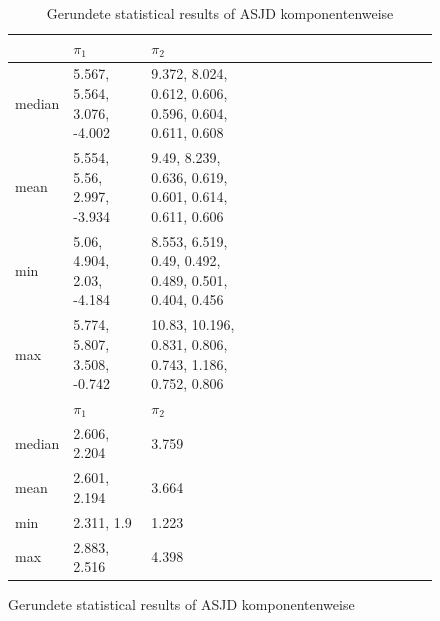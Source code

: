 \documentclass{scrartcl}
\begin{document}
    \begin{figure}[H]
        \begin{table}[H]
            \centering
            \begin{tabular}{|l|l|l|l|l|l|l|l|l|l|l|l|l|l|l|}
                \hline & $\pi_1$ & $\pi_2$ \\ \hline
                median & 5.567, 5.564, 3.076, -4.002 & 9.372, 8.024, 0.612, 0.606, 0.596, 0.604, 0.611, 0.608 \\\hline
                mean & 5.554, 5.56, 2.997, -3.934 & 9.49, 8.239, 0.636, 0.619, 0.601, 0.614, 0.611, 0.606 \\\hline
                min & 5.06, 4.904, 2.03, -4.184 & 8.553, 6.519, 0.49, 0.492, 0.489, 0.501, 0.404, 0.456 \\\hline
                max & 5.774, 5.807, 3.508, -0.742 & 10.83, 10.196, 0.831, 0.806, 0.743, 1.186, 0.752, 0.806 \\\hline
                \hline & $\pi_1$ & $\pi_2$ \\ \hline
                median & 2.606, 2.204 & 3.759 \\\hline
                mean & 2.601, 2.194 & 3.664 \\\hline
                min & 2.311, 1.9 & 1.223 \\\hline
                max & 2.883, 2.516 & 4.398 \\\hline
            \end{tabular}
            \caption{Gerundete statistical results of ASJD komponentenweise}
            \label{stat_results_asjd}
        \end{table}
    \end{figure}
\end{document}
